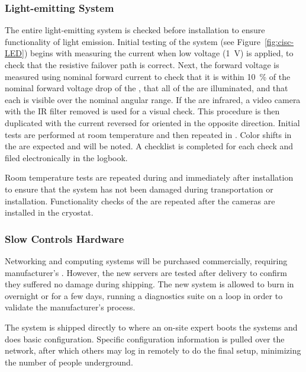 \subsubsection{Light-emitting System}
\label{sec:fdgen-slow-cryo-qc-les}

The entire light-emitting system is checked before installation to ensure functionality of light emission. 
Initial testing of the system (see Figure~\ref{fig:cisc-LED}) begins with
measuring the current when low voltage (\SI{1}{V}) is applied, to check
that the resistive  failover path is correct. Next, the forward voltage is measured using nominal forward current to
check that it is within \SI{10}{\%} of the nominal forward voltage drop of
the , that all of the  are illuminated, and that each  is visible over the nominal angular range. If the  are
infrared, a video camera with the IR filter removed is used for a
visual check. This procedure is then duplicated with the current
reversed for  oriented in the opposite direction. Initial tests are performed at room temperature and then repeated in . Color shifts in the  are expected and will be noted. A checklist is completed for each  check and filed electronically in the  logbook.

Room temperature tests are repeated during and immediately after installation to ensure that the system has not been damaged during transportation or installation. Functionality checks of the  are repeated after the cameras are installed in the cryostat.

\subsubsection{Slow Controls Hardware}
\label{sec:fdsp-slow-cryo-qc-sc-hard}

Networking and computing systems will be purchased commercially, requiring manufacturer's . However, the new servers %
are tested after delivery to confirm they suffered no damage during shipping. The new system is allowed to burn in overnight or for a few days, 
running a diagnostics suite on a loop in order to validate %
the manufacturer's  process.

The system %
is shipped directly to  
where an on-site
expert %
boots the systems and does basic
configuration. %
Specific configuration information %
is pulled over
the network, after which others may log in remotely to do the final
setup, minimizing the number of people underground.


